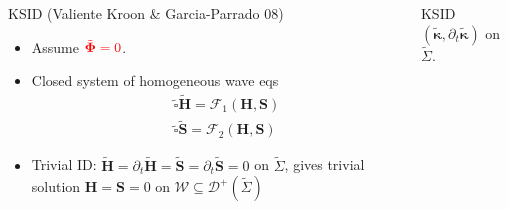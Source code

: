 \documentclass[10pt]{beamer}
\theoremstyle{plain}
\def\bmH{{\bm H}}
\def\bmS{{\bm S}}
\begin{document}
\begin{frame}
\begin{columns}
\begin{block}{KSID (Valiente Kroon \& Garcia-Parrado 08) }
\begin{itemize}
  \item Assume $\color{red}{\tilde{\bm\Phi}=0}$.
  \item Closed system of homogeneous wave eqs
    \begin{eqnarray*}
    && \tilde{\square} \tilde{\bmH} = \mathcal{F}_{1}(\bmH,\bmS)\\
    && \tilde{\square} \tilde{\bmS} = \mathcal{F}_{2}(\bmH,\bmS)
    \end{eqnarray*}
    \vspace{-5mm}
  \item
    Trivial ID: $\tilde{\bmH}=\partial_t\tilde{\bmH}=\tilde{\bmS}=\partial_t\tilde{\bmS}=0$ on $\tilde{\Sigma}$, gives trivial solution
    $\bmH=\bmS=0$ on $\mathcal{W}\subseteq \mathcal{D}^{+}(\tilde{\Sigma})$
  \end{itemize}
\end{block}
\begin{alertblock}{KSID}
  $(\bm\tilde{\kappa},\partial_t\bm\tilde{\kappa})$ on $\tilde{\Sigma}$.
\end{alertblock}
\end{columns}
\end{frame}
\end{document}
